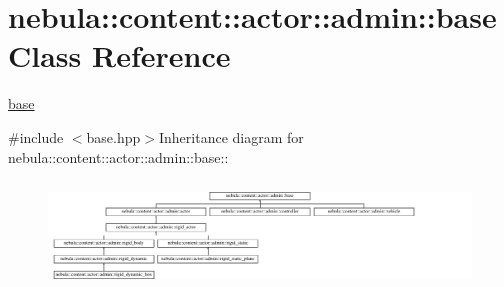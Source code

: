\hypertarget{classnebula_1_1content_1_1actor_1_1admin_1_1base}{
\section{nebula::content::actor::admin::base Class Reference}
\label{classnebula_1_1content_1_1actor_1_1admin_1_1base}
}


\hyperlink{classnebula_1_1content_1_1actor_1_1admin_1_1base}{base}  


{\ttfamily \#include $<$base.hpp$>$}Inheritance diagram for nebula::content::actor::admin::base::\begin{figure}[H]
\begin{center}
\leavevmode
\includegraphics[height=2.8866cm]{classnebula_1_1content_1_1actor_1_1admin_1_1base}
\end{center}
\end{figure}
